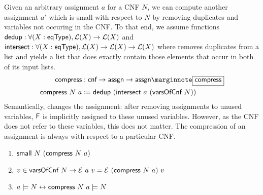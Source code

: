 Given an arbitrary assignment $a$ for a CNF $N$, we can compute another assignment $a'$ which is small with respect to $N$ by removing duplicates and variables not occuring in the CNF.
\mnote{\dedup}
To that end, we assume functions $\textsf{dedup} : \forall (X : \textsf{eqType}), \mathcal{L} (X) \rightarrow \mathcal{L} (X)$ and $\textsf{intersect} : \forall (X : \textsf{eqType}), \mathcal{L} (X) \rightarrow \mathcal{L} (X) \rightarrow \mathcal{L} (X)$ where \dedup{} removes duplicates from a list and \mnotec{\intersect} yields a list that does exactly contain those elements that occur in both of its input lists.
\begin{align*}
  \compressA &: \cnf \rightarrow \assgn \rightarrow \assgn\mnote{\compressA}\\
  \compressA~N~a &\defeq \dedup~(\intersect~a~(\varsOfCnf~N))
\end{align*}
Semantically, \compressA{} changes the assignment: after removing assignments to unused variables, $\mathsf{F}$ is implicitly assigned to these unused variables. However, as the CNF does not refer to these variables, this does not matter. The compression of an assignment is always with respect to a particular CNF.



\begin{lemma}\leavevmode
  \begin{enumerate}
    \item $\textsf{small}~N~(\textsf{compress}~N~a)$
    \item $v \in \textsf{varsOfCnf}~N \rightarrow \mathcal{E}~a~v = \mathcal{E}~(\textsf{compress}~N~a)~v$
    \item $a \models N \leftrightarrow \textsf{compress}~N~a \models N$
  \end{enumerate}
\end{lemma}

